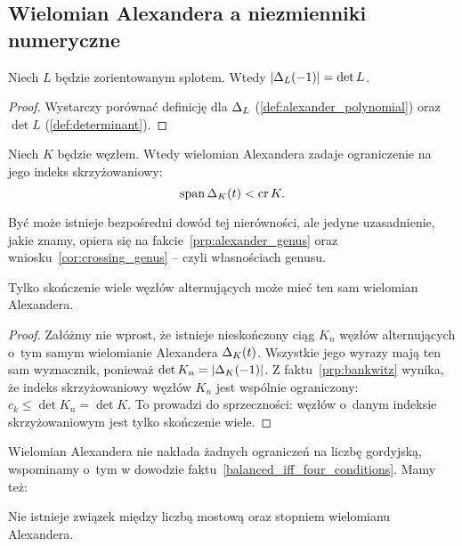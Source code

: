 
\subsection{Wielomian Alexandera a niezmienniki numeryczne}
\begin{proposition}
\label{prp:alexander_determinant}%
    Niech $L$ będzie zorientowanym splotem.
    Wtedy $|\Delta_L(-1)| = \det L$.
\end{proposition}

\begin{proof}
    Wystarczy porównać definicję dla $\Delta_L$ (\ref{def:alexander_polynomial}) oraz $\det L$ (\ref{def:determinant}).
\end{proof}

\begin{proposition}
    Niech $K$ będzie węzłem.
    Wtedy wielomian Alexandera zadaje ograniczenie na jego indeks skrzyżowaniowy:
    \begin{equation}
        \operatorname{span} \Delta_K(t) < \operatorname{cr} K.
    \end{equation}
\end{proposition}

Być może istnieje bezpośredni dowód tej nierówności, ale jedyne uzasadnienie, jakie znamy, opiera się na fakcie~\ref{prp:alexander_genus} oraz wniosku~\ref{cor:crossing_genus} -- czyli własnościach genusu.
%

\begin{proposition}
%
    Tylko skończenie wiele węzłów alternujących może mieć ten sam wielomian Alexandera.
\end{proposition}

\begin{proof}
    Załóżmy nie wprost, że istnieje nieskończony ciąg $K_n$ węzłów alternujących o~tym samym wielomianie Alexandera $\Delta_K(t)$.
    Wszystkie jego wyrazy mają ten sam wyznacznik, ponieważ $\det K_n = |\Delta_K(-1)|$.
    Z faktu~\ref{prp:bankwitz} wynika, że indeks skrzyżowaniowy węzłów $K_n$ jest wspólnie ograniczony: $c_k \le \det K_n = \det K$.
    To prowadzi do sprzeczności: węzłów o~danym indeksie skrzyżowaniowym jest tylko skończenie wiele.
\end{proof}

Wielomian Alexandera nie nakłada żadnych ograniczeń na liczbę gordyjską, wspominamy o~tym w dowodzie faktu~\ref{balanced_iff_four_conditions}.
Mamy też:

\begin{proposition}
%
\label{no_relation_bridge_alexander}%
    Nie istnieje związek między liczbą mostową oraz stopniem wielomianu Alexandera.
\end{proposition}

